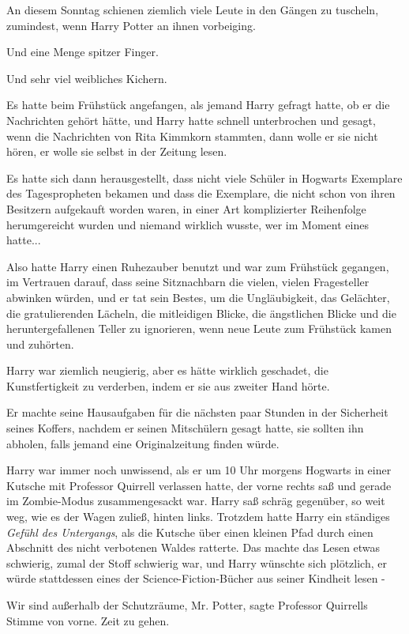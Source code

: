 An diesem Sonntag schienen ziemlich viele Leute in den Gängen zu tuscheln,
zumindest, wenn Harry Potter an ihnen vorbeiging.

Und eine Menge spitzer Finger.

Und sehr viel weibliches Kichern.

Es hatte beim Frühstück angefangen, als jemand Harry gefragt hatte, ob er die
Nachrichten gehört hätte, und Harry hatte schnell unterbrochen und gesagt, wenn
die Nachrichten von Rita Kimmkorn stammten, dann wolle er sie nicht hören, er
wolle sie selbst in der Zeitung lesen.

Es hatte sich dann herausgestellt, dass nicht viele Schüler in Hogwarts
Exemplare des Tagespropheten bekamen und dass die Exemplare, die nicht schon von
ihren Besitzern aufgekauft worden waren, in einer Art komplizierter Reihenfolge
herumgereicht wurden und niemand wirklich wusste, wer im Moment eines hatte...

Also hatte Harry einen Ruhezauber benutzt und war zum Frühstück gegangen, im
Vertrauen darauf, dass seine Sitznachbarn die vielen, vielen Fragesteller
abwinken würden, und er tat sein Bestes, um die Ungläubigkeit, das Gelächter,
die gratulierenden Lächeln, die mitleidigen Blicke, die ängstlichen Blicke und
die heruntergefallenen Teller zu ignorieren, wenn neue Leute zum Frühstück kamen
und zuhörten.

Harry war ziemlich neugierig, aber es hätte wirklich geschadet, die
Kunstfertigkeit zu verderben, indem er sie aus zweiter Hand hörte.

Er machte seine Hausaufgaben für die nächsten paar Stunden in der Sicherheit
seines Koffers, nachdem er seinen Mitschülern gesagt hatte, sie sollten ihn
abholen, falls jemand eine Originalzeitung finden würde.

Harry war immer noch unwissend, als er um 10 Uhr morgens Hogwarts in einer
Kutsche mit Professor Quirrell verlassen hatte, der vorne rechts saß und gerade
im Zombie-Modus zusammengesackt war. Harry saß schräg gegenüber, so weit weg,
wie es der Wagen zuließ, hinten links. Trotzdem hatte Harry ein ständiges
\emph{Gefühl des Untergangs}, als die Kutsche über einen kleinen Pfad durch
einen Abschnitt des nicht verbotenen Waldes ratterte. Das machte das Lesen etwas
schwierig, zumal der Stoff schwierig war, und Harry wünschte sich plötzlich, er
würde stattdessen eines der Science-Fiction-Bücher aus seiner Kindheit lesen -

\glqq{}Wir sind außerhalb der Schutzräume, Mr. Potter\grqq{}, sagte Professor
Quirrells Stimme von vorne. \glqq{}Zeit zu gehen.\grqq{}

